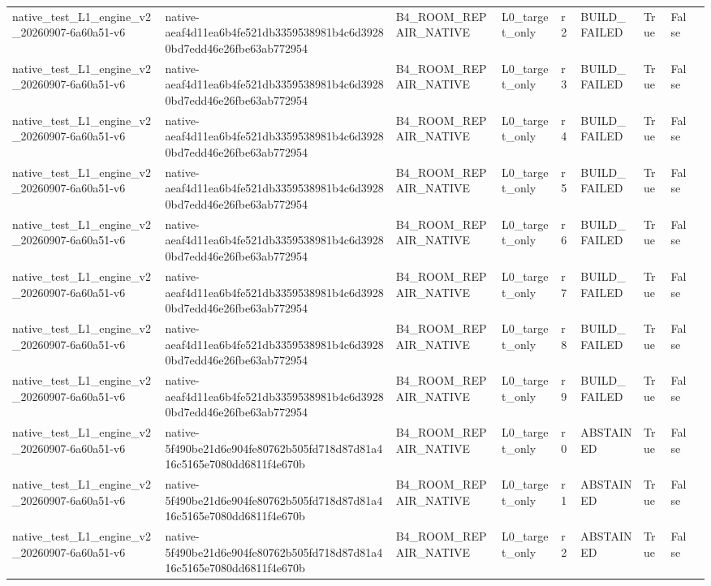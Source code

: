 \begin{tabular}{lllllllll}
native\_test\_L1\_engine\_v2\_20260907-6a60a51-v6 & native-aeaf4d11ea6b4fe521db3359538981b4c6d39280bd7edd46e26fbe63ab772954 & B4\_ROOM\_REPAIR\_NATIVE & L0\_target\_only & r2 & BUILD\_FAILED & True & False &  \\
native\_test\_L1\_engine\_v2\_20260907-6a60a51-v6 & native-aeaf4d11ea6b4fe521db3359538981b4c6d39280bd7edd46e26fbe63ab772954 & B4\_ROOM\_REPAIR\_NATIVE & L0\_target\_only & r3 & BUILD\_FAILED & True & False &  \\
native\_test\_L1\_engine\_v2\_20260907-6a60a51-v6 & native-aeaf4d11ea6b4fe521db3359538981b4c6d39280bd7edd46e26fbe63ab772954 & B4\_ROOM\_REPAIR\_NATIVE & L0\_target\_only & r4 & BUILD\_FAILED & True & False &  \\
native\_test\_L1\_engine\_v2\_20260907-6a60a51-v6 & native-aeaf4d11ea6b4fe521db3359538981b4c6d39280bd7edd46e26fbe63ab772954 & B4\_ROOM\_REPAIR\_NATIVE & L0\_target\_only & r5 & BUILD\_FAILED & True & False &  \\
native\_test\_L1\_engine\_v2\_20260907-6a60a51-v6 & native-aeaf4d11ea6b4fe521db3359538981b4c6d39280bd7edd46e26fbe63ab772954 & B4\_ROOM\_REPAIR\_NATIVE & L0\_target\_only & r6 & BUILD\_FAILED & True & False &  \\
native\_test\_L1\_engine\_v2\_20260907-6a60a51-v6 & native-aeaf4d11ea6b4fe521db3359538981b4c6d39280bd7edd46e26fbe63ab772954 & B4\_ROOM\_REPAIR\_NATIVE & L0\_target\_only & r7 & BUILD\_FAILED & True & False &  \\
native\_test\_L1\_engine\_v2\_20260907-6a60a51-v6 & native-aeaf4d11ea6b4fe521db3359538981b4c6d39280bd7edd46e26fbe63ab772954 & B4\_ROOM\_REPAIR\_NATIVE & L0\_target\_only & r8 & BUILD\_FAILED & True & False &  \\
native\_test\_L1\_engine\_v2\_20260907-6a60a51-v6 & native-aeaf4d11ea6b4fe521db3359538981b4c6d39280bd7edd46e26fbe63ab772954 & B4\_ROOM\_REPAIR\_NATIVE & L0\_target\_only & r9 & BUILD\_FAILED & True & False &  \\
native\_test\_L1\_engine\_v2\_20260907-6a60a51-v6 & native-5f490be21d6e904fe80762b505fd718d87d81a416c5165e7080dd6811f4e670b & B4\_ROOM\_REPAIR\_NATIVE & L0\_target\_only & r0 & ABSTAINED & True & False &  \\
native\_test\_L1\_engine\_v2\_20260907-6a60a51-v6 & native-5f490be21d6e904fe80762b505fd718d87d81a416c5165e7080dd6811f4e670b & B4\_ROOM\_REPAIR\_NATIVE & L0\_target\_only & r1 & ABSTAINED & True & False &  \\
native\_test\_L1\_engine\_v2\_20260907-6a60a51-v6 & native-5f490be21d6e904fe80762b505fd718d87d81a416c5165e7080dd6811f4e670b & B4\_ROOM\_REPAIR\_NATIVE & L0\_target\_only & r2 & ABSTAINED & True & False &  \\

\end{tabular}
